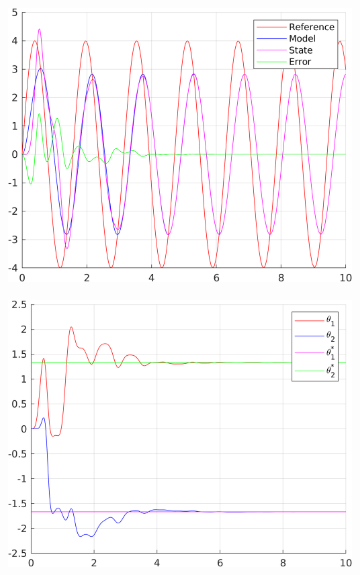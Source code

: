 \documentclass[12pt,a4paper]{article}
\begin{document}
		\begin{figure}[H]
			\centering
			\begin{subfigure}{.45\textwidth}
				\centering
				\includegraphics[width=1\textwidth]{Graphics/LinearState2.png}
			\end{subfigure}%
			\begin{subfigure}{.45\textwidth}
				\centering
				\includegraphics[width=1\textwidth]{Graphics/LinearParameters2.png}
			\end{subfigure}
			\begin{subfigure}{.45\textwidth}
				\centering

\end{subfigure}
\end{figure}
\end{document}
